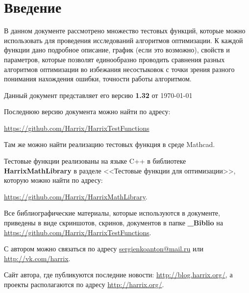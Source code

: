 \chapter*{Введение}

В данном документе рассмотрено множество тестовых функций, которые можно использовать для проведения исследований алгоритмов оптимизации. К каждой функции дано подробное описание, график (если это возможно), свойств и параметров, которые позволят единообразно проводить сравнения разных алгоритмов оптимизации во избежания несостыковок с точки зрения разного понимания нахождения ошибки, точности работы алгоритмом.

Данный документ представляет его версию \textbf{1.32} от \today

Последнюю версию документа можно найти по адресу:

\href{https://github.com/Harrix/HarrixTestFunctions}{https://github.com/Harrix/HarrixTestFunctions}

Там же можно найти реализацию тестовых функция в среде Mathcad.

Тестовые функции реализованы на языке C++ в библиотеке  \textbf{HarrixMathLibrary} в разделе <<Тестовые функции для оптимизации>>, которую можно найти по адресу:

\href{https://github.com/Harrix/HarrixMathLibrary} {https://github.com/Harrix/HarrixMathLibrary}.

Все библиографические материалы, которые используются в документе, приведены в виде скриншотов, скринов, документов в папке \textbf{\_Biblio} на \href{https://github.com/Harrix/HarrixTestFunctions}{https://github.com/Harrix/HarrixTestFunctions}.

С автором можно связаться по адресу \href{mailto:sergienkoanton@mail.ru}{sergienkoanton@mail.ru} или  \href{http://vk.com/harrix}{http://vk.com/harrix}.

Сайт автора, где публикуются последние новости: \href{http://blog.harrix.org/}{http://blog.harrix.org/}, а проекты располагаются по адресу \href{http://harrix.org/}{http://harrix.org/}.


\clearpage